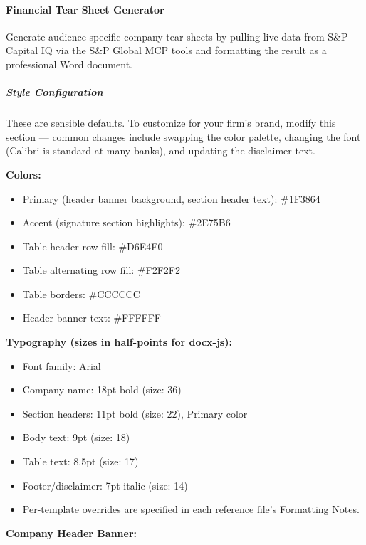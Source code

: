 \documentclass[11pt]{article}
\begin{document}
\paragraph{Financial Tear Sheet Generator}\mbox{}\par

Generate audience-specific company tear sheets by pulling live data from S\&P Capital IQ via the S\&P Global MCP tools and formatting the result as a professional Word document.


\subparagraph{Style Configuration}\mbox{}\par

These are sensible defaults. To customize for your firm's brand, modify this section — common changes include swapping the color palette, changing the font (Calibri is standard at many banks), and updating the disclaimer text.


\textbf{Colors:}

\begin{itemize}[leftmargin=*,itemsep=2pt,topsep=2pt]
\item {} Primary (header banner background, section header text): \#1F3864
\item {} Accent (signature section highlights): \#2E75B6
\item {} Table header row fill: \#D6E4F0
\item {} Table alternating row fill: \#F2F2F2
\item {} Table borders: \#CCCCCC
\item {} Header banner text: \#FFFFFF
\end{itemize}

\textbf{Typography (sizes in half-points for docx-js):}

\begin{itemize}[leftmargin=*,itemsep=2pt,topsep=2pt]
\item {} Font family: Arial
\item {} Company name: 18pt bold (size: 36)
\item {} Section headers: 11pt bold (size: 22), Primary color
\item {} Body text: 9pt (size: 18)
\item {} Table text: 8.5pt (size: 17)
\item {} Footer/disclaimer: 7pt italic (size: 14)
\item {} Per-template overrides are specified in each reference file's Formatting Notes.
\end{itemize}

\textbf{Company Header Banner:}
\end{document}
